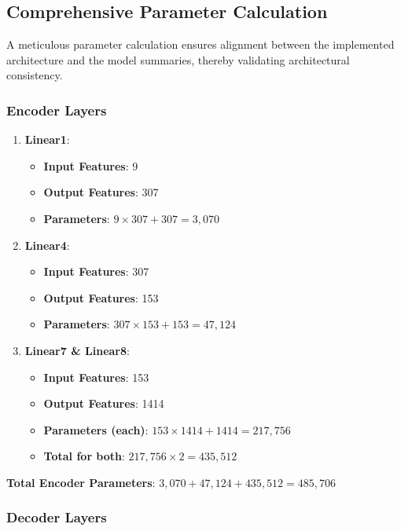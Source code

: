 \documentclass[10pt]{article}
\begin{document}
\subsection{Comprehensive Parameter Calculation}

A meticulous parameter calculation ensures alignment between the implemented architecture and the model summaries, thereby validating architectural consistency.

\subsubsection{Encoder Layers}

\begin{enumerate}
    \item \textbf{Linear1}:
    \begin{itemize}
        \item \textbf{Input Features}: 9
        \item \textbf{Output Features}: 307
        \item \textbf{Parameters}: \( 9 \times 307 + 307 = 3,070 \)
    \end{itemize}
    
    \item \textbf{Linear4}:
    \begin{itemize}
        \item \textbf{Input Features}: 307
        \item \textbf{Output Features}: 153
        \item \textbf{Parameters}: \( 307 \times 153 + 153 = 47,124 \)
    \end{itemize}
    
    \item \textbf{Linear7 \& Linear8}:
    \begin{itemize}
        \item \textbf{Input Features}: 153
        \item \textbf{Output Features}: 1414
        \item \textbf{Parameters (each)}: \( 153 \times 1414 + 1414 = 217,756 \)
        \item \textbf{Total for both}: \( 217,756 \times 2 = 435,512 \)
    \end{itemize}
\end{enumerate}

\textbf{Total Encoder Parameters}: \( 3,070 + 47,124 + 435,512 = 485,706 \)

\subsubsection{Decoder Layers}
\end{document}
